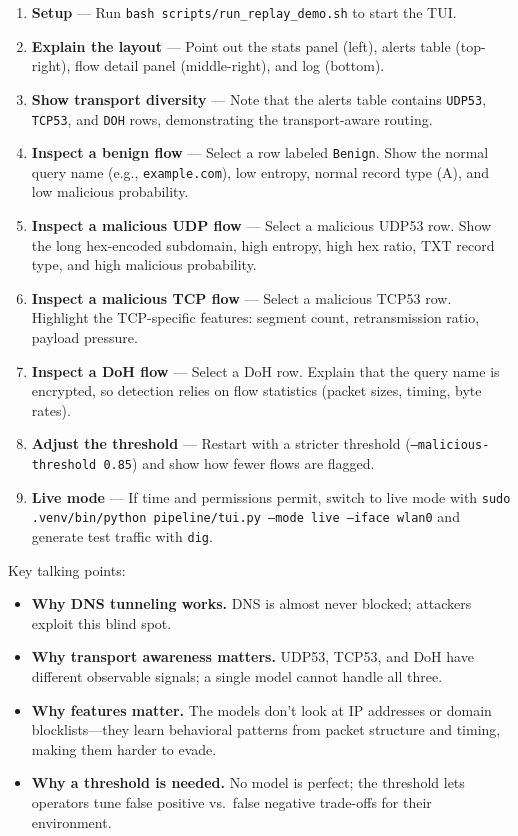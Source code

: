 \documentclass[12pt,a4paper]{article}
\begin{document}
\begin{enumerate}
    \item \textbf{Setup} --- Run \texttt{bash scripts/run\_replay\_demo.sh} to start the TUI.
    \item \textbf{Explain the layout} --- Point out the stats panel (left), alerts table (top-right), flow detail panel (middle-right), and log (bottom).
    \item \textbf{Show transport diversity} --- Note that the alerts table contains \texttt{UDP53}, \texttt{TCP53}, and \texttt{DOH} rows, demonstrating the transport-aware routing.
    \item \textbf{Inspect a benign flow} --- Select a row labeled \texttt{Benign}. Show the normal query name (e.g., \texttt{example.com}), low entropy, normal record type (A), and low malicious probability.
    \item \textbf{Inspect a malicious UDP flow} --- Select a malicious UDP53 row. Show the long hex-encoded subdomain, high entropy, high hex ratio, TXT record type, and high malicious probability.
    \item \textbf{Inspect a malicious TCP flow} --- Select a malicious TCP53 row. Highlight the TCP-specific features: segment count, retransmission ratio, payload pressure.
    \item \textbf{Inspect a DoH flow} --- Select a DoH row. Explain that the query name is encrypted, so detection relies on flow statistics (packet sizes, timing, byte rates).
    \item \textbf{Adjust the threshold} --- Restart with a stricter threshold (\texttt{--malicious-threshold 0.85}) and show how fewer flows are flagged.
    \item \textbf{Live mode} --- If time and permissions permit, switch to live mode with \texttt{sudo .venv/bin/python pipeline/tui.py --mode live --iface wlan0} and generate test traffic with \texttt{dig}.
\end{enumerate}

Key talking points:
\begin{itemize}
    \item \textbf{Why DNS tunneling works.} DNS is almost never blocked; attackers exploit this blind spot.
    \item \textbf{Why transport awareness matters.} UDP53, TCP53, and DoH have different observable signals; a single model cannot handle all three.
    \item \textbf{Why features matter.} The models don't look at IP addresses or domain blocklists---they learn behavioral patterns from packet structure and timing, making them harder to evade.
    \item \textbf{Why a threshold is needed.} No model is perfect; the threshold lets operators tune false positive vs.\ false negative trade-offs for their environment.
\end{itemize}
\end{document}
